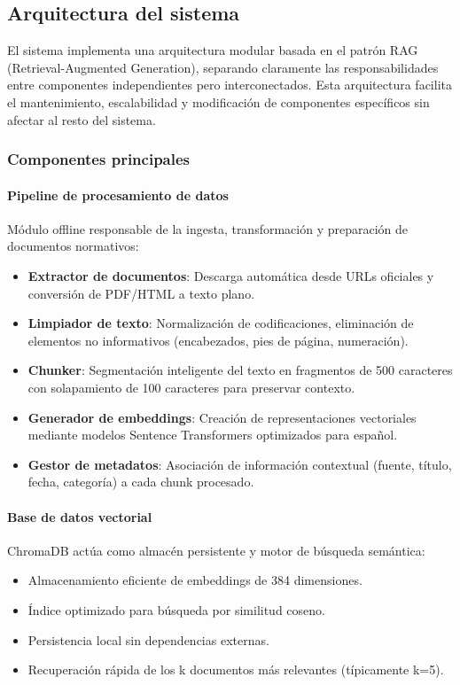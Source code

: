 \documentclass[a4paper,12pt]{article}
\begin{document}
\subsection{Arquitectura del sistema}

El sistema implementa una arquitectura modular basada en el patrón RAG (Retrieval-Augmented Generation), separando claramente las responsabilidades entre componentes independientes pero interconectados. Esta arquitectura facilita el mantenimiento, escalabilidad y modificación de componentes específicos sin afectar al resto del sistema.

\subsubsection{Componentes principales}

\paragraph{Pipeline de procesamiento de datos}
Módulo offline responsable de la ingesta, transformación y preparación de documentos normativos:

\begin{itemize}
    \item \textbf{Extractor de documentos}: Descarga automática desde URLs oficiales y conversión de PDF/HTML a texto plano.
    \item \textbf{Limpiador de texto}: Normalización de codificaciones, eliminación de elementos no informativos (encabezados, pies de página, numeración).
    \item \textbf{Chunker}: Segmentación inteligente del texto en fragmentos de 500 caracteres con solapamiento de 100 caracteres para preservar contexto.
    \item \textbf{Generador de embeddings}: Creación de representaciones vectoriales mediante modelos Sentence Transformers optimizados para español.
    \item \textbf{Gestor de metadatos}: Asociación de información contextual (fuente, título, fecha, categoría) a cada chunk procesado.
\end{itemize}

\paragraph{Base de datos vectorial}
ChromaDB actúa como almacén persistente y motor de búsqueda semántica:

\begin{itemize}
    \item Almacenamiento eficiente de embeddings de 384 dimensiones.
    \item Índice optimizado para búsqueda por similitud coseno.
    \item Persistencia local sin dependencias externas.
    \item Recuperación rápida de los k documentos más relevantes (típicamente k=5).
\end{itemize}
\end{document}
